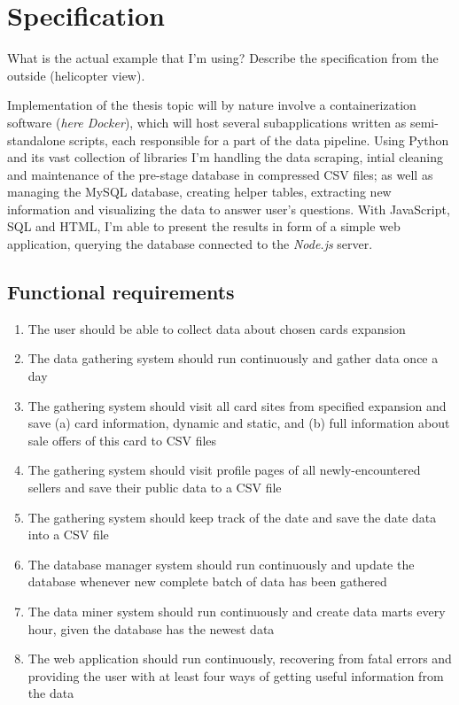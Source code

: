 \chapter{Specification}
\label{ch:specification}
What is the actual example that I'm using? Describe the specification from the outside (helicopter view).

Implementation of the thesis topic will by nature involve a containerization software (\textit{here Docker}), which will host several subapplications written as semi-standalone scripts, each responsible for a part of the data pipeline. Using Python and its vast collection of libraries I'm handling the data scraping, intial cleaning and maintenance of the pre-stage database in compressed CSV files; as well as managing the MySQL database, creating helper tables, extracting new information and visualizing the data to answer user's questions. With JavaScript, SQL and HTML, I'm able to present the results in form of a simple web application, querying the database connected to the \textit{Node.js} server.


\section{Functional requirements}
\begin{enumerate}
\item The user should be able to collect data about chosen cards expansion
\item The data gathering system should run continuously and gather data once a day
\item The gathering system should visit all card sites from specified expansion and save (a) card information, dynamic and static, and (b) full information about sale offers of this card to CSV files
\item The gathering system should visit profile pages of all newly-encountered sellers and save their public data to a CSV file
\item The gathering system should keep track of the date and save the date data into a CSV file
\item The database manager system should run continuously and update the database whenever new complete batch of data has been gathered
\item The data miner system should run continuously and create data marts every hour, given the database has the newest data
\item The web application should run continuously, recovering from fatal errors and providing the user with at least four ways of getting useful information from the data
\end{enumerate}


